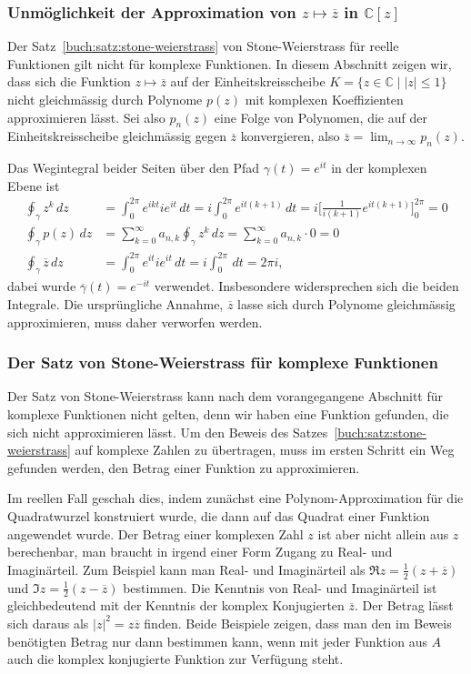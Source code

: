 \subsubsection{Unmöglichkeit der Approximation von $z\mapsto \overline{z}$
in $\mathbb{C}[z]$}
Der Satz~\ref{buch:satz:stone-weierstrass} von Stone-Weierstrass für
reelle Funktionen gilt nicht für komplexe Funktionen.
In diesem Abschnitt zeigen wir, dass sich die Funktion $z\mapsto\overline{z}$
auf der Einheitskreisscheibe $K=\{z\in\mathbb{C} \mid |z|\le 1\}$ nicht
gleichmässig durch Polynome $p(z)$ mit komplexen Koeffizienten approximieren
lässt.
Sei also $p_n(z)$ eine Folge von Polynomen, die auf der Einheitskreisscheibe
gleichmässig gegen $\overline{z}$ konvergieren, also
$\overline{z}=\lim_{n\to\infty}p_n(z)$.

Das Wegintegral beider Seiten über den Pfad $\gamma(t) = e^{it}$
in der komplexen Ebene ist
\begin{align*}
\oint_\gamma z^k\,dz
&=
\int_0^{2\pi} e^{ikt} ie^{it}\,dt
=
i\int_0^{2\pi} e^{it(k+1)}\,dt
=
i\biggl[ \frac{1}{i(k+1)} e^{it(k+1)}\biggr]_0^{2\pi}
=
0
\\
\oint_\gamma
p(z)
\,dz
&=
\sum_{k=0}^\infty a_{n,k} \oint_\gamma z^k\,dz
=
\sum_{k=0}^\infty a_{n,k}\cdot 0
=
0
\\
\oint_\gamma \overline{z}\,dz
&=
\int_0^{2\pi} e^{it} ie^{it}\,dt
=
i\int_0^{2\pi} \,dt = 2\pi i,
\end{align*}
dabei wurde $\overline{\gamma}(t)=e^{-it}$ verwendet.
Insbesondere widersprechen sich die beiden Integrale.
Die ursprüngliche Annahme, $\overline{z}$ lasse sich durch Polynome
gleichmässig approximieren, muss daher verworfen werden.

\subsubsection{Der Satz von Stone-Weierstrass für komplexe Funktionen}
Der Satz von Stone-Weierstrass kann nach dem vorangegangene Abschnitt
für komplexe Funktionen nicht gelten, denn wir haben eine Funktion
gefunden, die sich nicht approximieren lässt.
Um den Beweis des Satzes~\ref{buch:satz:stone-weierstrass}
auf komplexe Zahlen zu übertragen, muss im ersten Schritt ein Weg
gefunden werden, den Betrag einer Funktion zu approximieren.

Im reellen Fall geschah dies, indem zunächst eine Polynom-Approximation
für die Quadratwurzel konstruiert wurde, die dann auf das Quadrat einer
Funktion angewendet wurde.
Der Betrag einer komplexen Zahl $z$ ist aber nicht allein aus $z$
berechenbar, man braucht in irgend einer Form Zugang zu Real-
und Imaginärteil.
Zum Beispiel kann man Real- und Imaginärteil als
$\Re z= \frac12(z+\overline{z})$ und $\Im z = \frac12(z-\overline{z})$
bestimmen.
Die Kenntnis von Real- und Imaginärteil ist gleichbedeutend mit
der Kenntnis der komplex Konjugierten $\overline{z}$.
Der Betrag lässt sich daraus als $|z|^2 = z\overline{z}$ finden.
Beide Beispiele zeigen, dass man den im Beweis benötigten Betrag
nur dann bestimmen kann, wenn mit jeder Funktion aus $A$ auch die
komplex konjugierte Funktion zur Verfügung steht.

